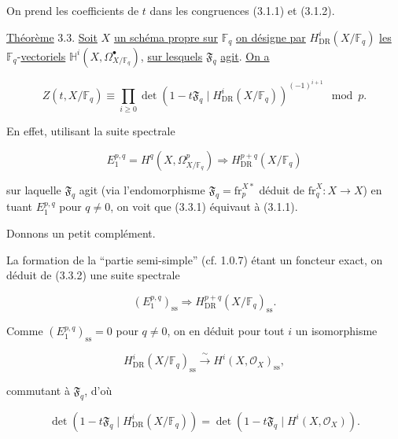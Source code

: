On prend les coefficients de $t$ dans les congruences (3.1.1) et (3.1.2).

\underline{Théorème} 3.3. \underline{Soit} $X$ \underline{un schéma propre sur}
$\mathbb F_q$ \underline{on désigne par} $H^i_{\mathrm{DR}}(X/\mathbb F_q)$ \underline{les}
$\mathbb F_q$-\underline{vectoriels} $\mathbb H^i(X,\Omega^\bullet_{X/\mathbb F_q})$, \underline{sur lesquels}
$\mathfrak F_q$ \underline{agit}. \underline{On a}

\begin{equation}\tag{3.3.1}
Z(t,X/\mathbb F_q)
\equiv
\prod_{i\geq0}
\det\!\left(1-t\mathfrak F_q\mid
H^i_{\mathrm{DR}}(X/\mathbb F_q)\right)^{(-1)^{i+1}}
\mod p.
\end{equation}

En effet, utilisant la suite spectrale

\begin{equation}\tag{3.3.2}
E_1^{p,q}=H^q(X,\Omega^p_{X/\mathbb F_q})
\Longrightarrow H^{p+q}_{\mathrm{DR}}(X/\mathbb F_q)
\end{equation}

sur laquelle $\mathfrak F_q$ agit (via l'endomorphisme
$\mathfrak F_q=\mathrm{fr}_p^{X*}$ déduit de
$\mathrm{fr}_q^X:X\longrightarrow X$) en tuant $E_1^{p,q}$ pour $q\ne0$, on
voit que (3.3.1) équivaut à (3.1.1).

Donnons un petit complément.

La formation de la ``partie semi-simple'' (cf. 1.0.7) étant un foncteur
exact, on déduit de (3.3.2) une suite spectrale

\begin{equation}\tag{3.3.3}
(E_1^{p,q})_{\mathrm{ss}}
\Longrightarrow H^{p+q}_{\mathrm{DR}}(X/\mathbb F_q)_{\mathrm{ss}}.
\end{equation}

Comme $(E_1^{p,q})_{\mathrm{ss}}=0$ pour $q\ne0$, on en déduit pour tout
$i$ un isomorphisme

\begin{equation}\tag{3.3.4}
H^i_{\mathrm{DR}}(X/\mathbb F_q)_{\mathrm{ss}}
\xrightarrow{\ \sim\ }
H^i(X,\mathcal O_X)_{\mathrm{ss}},
\end{equation}

commutant à $\mathfrak F_q$, d'où

\begin{equation}\tag{3.3.5}
\det\!\left(1-t\mathfrak F_q\mid H^i_{\mathrm{DR}}(X/\mathbb F_q)\right)
=
\det\!\left(1-t\mathfrak F_q\mid H^i(X,\mathcal O_X)\right).
\end{equation}

